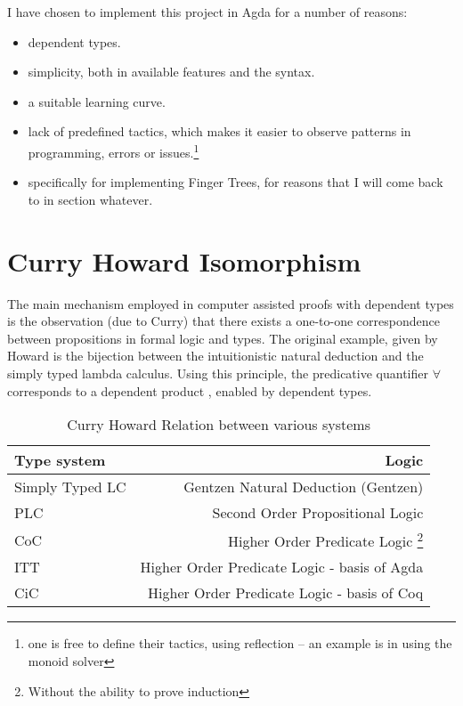 \documentclass[12pt,twoside,notitlepage]{report}
\begin{document}
I have chosen to implement this project in Agda for a number of reasons: 
\begin{itemize}

\item dependent types.
\item simplicity, both in available features and the syntax.
\item a suitable learning curve.
\item lack of predefined tactics, which makes it easier to observe patterns in programming, errors or issues.\footnote{one is free to define their tactics, using reflection  – an example is in using the monoid solver}
\item specifically for implementing Finger Trees, for reasons that I will come back to in section whatever.
\end{itemize}

\section{Curry Howard Isomorphism}

The main mechanism employed in computer assisted proofs with dependent types is the observation (due to Curry) that there exists a one-to-one correspondence between propositions in formal logic and types. The original example, given by Howard is the bijection between the intuitionistic natural deduction and the simply typed lambda calculus.
Using this principle, the predicative quantifier $\forall$ corresponds to a dependent product
\cite{hindely_milner} , enabled by dependent types.


\begin{table}[h!]
\centering 
	\begin{tabular}{l r} 
	\hline
	Type system & Logic \\
	\hline 
	Simply Typed LC  & Gentzen Natural Deduction (Gentzen) \\
	PLC & Second Order Propositional Logic \\
	CoC &  Higher Order Predicate Logic \footnote{Without the ability to prove induction} \\
	ITT & Higher Order Predicate Logic - basis of Agda \\ 
	CiC & Higher Order Predicate Logic - basis of Coq \\   
	\hline 
	\end{tabular}
\caption{Curry Howard Relation between various systems}
\end{table}
\end{document}
